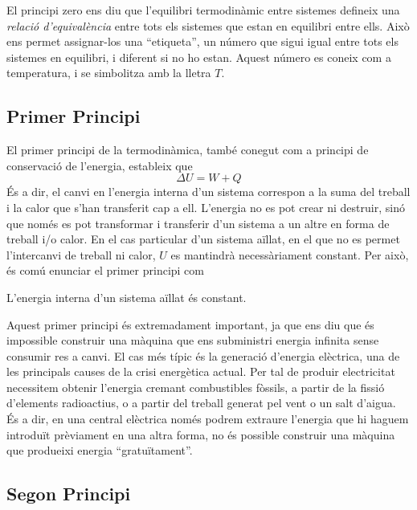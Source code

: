 \documentclass[12pt]{book}
\begin{document}
El principi zero ens diu que l'equilibri termodinàmic entre sistemes defineix una {\it relació d'equivalència} entre tots els sistemes que estan en equilibri entre ells. Això ens permet assignar-los una ``etiqueta'', un número que sigui igual entre tots els sistemes en equilibri, i diferent si no ho estan. Aquest número es coneix com a temperatura, i se simbolitza amb la lletra $T$.

\subsection{Primer Principi}

El primer principi de la termodinàmica, també conegut com a principi de conservació de l'energia, estableix que
%
\begin{equation}
    \boxed{\Delta U = W + Q}
    \label{eqn:Stokes}
\end{equation}
%
És a dir, el canvi en l'energia interna d'un sistema correspon a la suma del treball i la calor que s'han transferit cap a ell. L'energia no es pot crear ni destruir, sinó que només es pot transformar i transferir d'un sistema a un altre en forma de treball i/o calor. En el cas particular d'un sistema aïllat, en el que no es permet l'intercanvi de treball ni calor, $U$ es mantindrà necessàriament constant. Per això, és comú enunciar el primer principi com

\begin{mdframed}
\begin{it}
    L’energia interna d’un sistema aïllat és constant.
\end{it}
\end{mdframed}

Aquest primer principi és extremadament important, ja que ens diu que és impossible construir una màquina que ens subministri energia infinita sense consumir res a canvi. El cas més típic és la generació d'energia elèctrica, una de les principals causes de la crisi energètica actual. Per tal de produir electricitat necessitem obtenir l'energia cremant combustibles fòssils, a partir de la fissió d'elements radioactius, o a partir del treball generat pel vent o un salt d'aigua. És a dir, en una central elèctrica només podrem extraure l'energia que hi haguem introduït prèviament en una altra forma, no és possible construir una màquina que produeixi energia ``gratuïtament''.

\subsection{Segon Principi}
\end{document}
